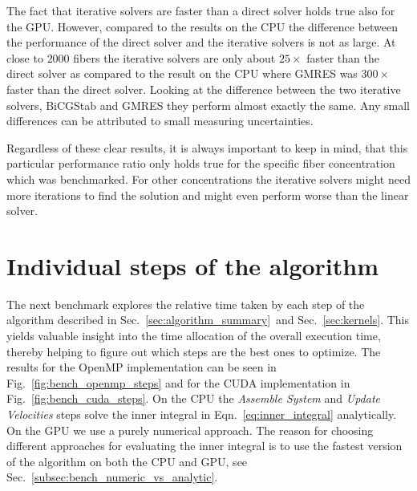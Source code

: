 The fact that iterative solvers are faster than a direct solver holds true also for the GPU. However, compared to the results on the CPU the difference between the performance of the direct solver and the iterative solvers is not as large. At close to $2000$ fibers the iterative solvers are only about $25×$ faster than the direct solver as compared to the result on the CPU where GMRES was $300×$ faster than the direct solver. Looking at the difference between the two iterative solvers, BiCGStab and GMRES they perform almost exactly the same. Any small differences can be attributed to small measuring uncertainties. 

Regardless of these clear results, it is always important to keep in mind, that this particular performance ratio only holds true for the specific fiber concentration which was benchmarked. For other concentrations the iterative solvers might need more iterations to find the solution and might even perform worse than the linear solver.

\section{Individual steps of the algorithm}

The next benchmark explores the relative time taken by each step of the algorithm described in Sec.~\ref{sec:algorithm_summary}~and Sec.~\ref{sec:kernels}. This yields valuable insight into the time allocation of the overall execution time, thereby helping to figure out which steps are the best ones to optimize. The results for the OpenMP implementation can be seen in Fig.~\ref{fig:bench_openmp_steps} and for the CUDA implementation in Fig.~\ref{fig:bench_cuda_steps}. On the CPU the \emph{Assemble System} and \emph{Update Velocities} steps solve the inner integral in Eqn.~\eqref{eq:inner_integral} analytically. On the GPU we use a purely numerical approach. The reason for choosing different approaches for evaluating the inner integral is to use the fastest version of the algorithm on both the CPU and GPU, see Sec.~\ref{subsec:bench_numeric_vs_analytic}.

